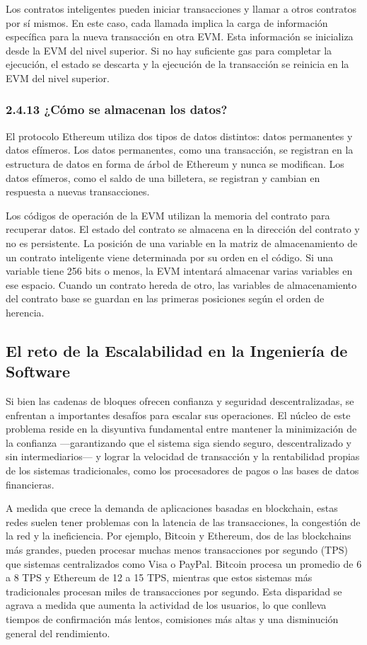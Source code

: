 \documentclass[12pt,a4paper]{article}
\begin{document}
Los contratos inteligentes pueden iniciar transacciones y llamar a otros contratos por sí
mismos. En este caso, cada llamada implica la carga de información específica para la
nueva transacción en otra EVM. Esta información se inicializa desde la EVM del nivel
superior. Si no hay suficiente gas para completar la ejecución, el estado se descarta y la
ejecución de la transacción se reinicia en la EVM del nivel superior.

\subsubsection*{2.4.13 ¿Cómo se almacenan los datos?}

El protocolo Ethereum utiliza dos tipos de datos distintos: datos permanentes y datos
efímeros. Los datos permanentes, como una transacción, se registran en la estructura de
datos en forma de árbol de Ethereum y nunca se modifican. Los datos efímeros, como el
saldo de una billetera, se registran y cambian en respuesta a nuevas transacciones.

Los códigos de operación de la EVM utilizan la memoria del contrato para recuperar datos.
El estado del contrato se almacena en la dirección del contrato y no es persistente. La
posición de una variable en la matriz de almacenamiento de un contrato inteligente viene
determinada por su orden en el código. Si una variable tiene 256 bits o menos, la EVM
intentará almacenar varias variables en ese espacio. Cuando un contrato hereda de otro, las
variables de almacenamiento del contrato base se guardan en las primeras posiciones
según el orden de herencia.

\subsection*{El reto de la Escalabilidad en la Ingeniería de Software}

Si bien las cadenas de bloques ofrecen confianza y seguridad descentralizadas, se
enfrentan a importantes desafíos para escalar sus operaciones. El núcleo de este problema
reside en la disyuntiva fundamental entre mantener la minimización de la confianza
---garantizando que el sistema siga siendo seguro, descentralizado y sin intermediarios--- y
lograr la velocidad de transacción y la rentabilidad propias de los sistemas tradicionales,
como los procesadores de pagos o las bases de datos financieras.

A medida que crece la demanda de aplicaciones basadas en blockchain, estas redes suelen
tener problemas con la latencia de las transacciones, la congestión de la red y la
ineficiencia. Por ejemplo, Bitcoin y Ethereum, dos de las blockchains más grandes, pueden
procesar muchas menos transacciones por segundo (TPS) que sistemas centralizados
como Visa o PayPal. Bitcoin procesa un promedio de 6 a 8 TPS y Ethereum de 12 a 15
TPS, mientras que estos sistemas más tradicionales procesan miles de transacciones por
segundo. Esta disparidad se agrava a medida que aumenta la actividad de los usuarios, lo
que conlleva tiempos de confirmación más lentos, comisiones más altas y una disminución
general del rendimiento.
\end{document}
